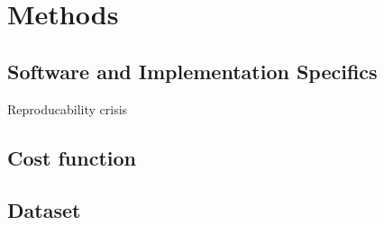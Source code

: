 \chapter{Methods}
\label{chap:methods}

\section{Software and Implementation Specifics}
\label{sec:software_and_implementation}
Reproducability crisis
\section{Cost function}
\section{Dataset}